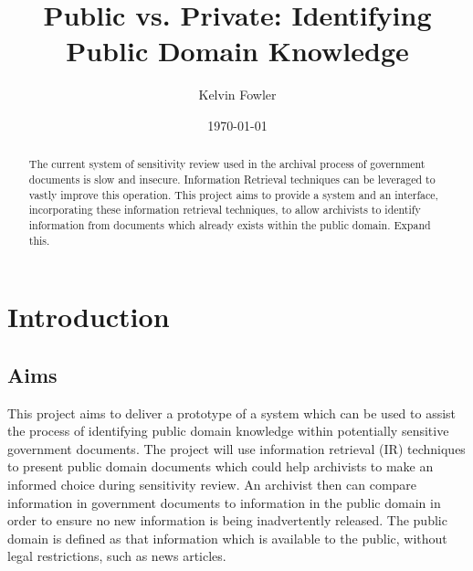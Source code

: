 \documentclass{l4proj}
\title{Public vs. Private: \newline Identifying Public Domain Knowledge}
\author{Kelvin Fowler}
\date{\today}
\begin{document}
\maketitle

\begin{abstract}
The current system of sensitivity review used in the archival process of government documents is slow and insecure. Information Retrieval techniques can be leveraged to vastly improve this operation. This project aims to provide a system and an interface, incorporating these information retrieval techniques, to allow archivists to identify information from documents which already exists within the public domain.
Expand this.
\end{abstract}


\educationalconsent
\tableofcontents
\listoftodos

\chapter{Introduction}

\section{Aims}
This project aims to deliver a prototype of a system which can be used to assist the process of identifying public domain knowledge within potentially sensitive government documents. The project will use information retrieval (IR) techniques to present public domain documents which could help archivists to make an informed choice during sensitivity review. An archivist then can compare information in government documents to information in the public domain in order to ensure no new information is being inadvertently released.
The public domain is defined as that information which is available to the public, without legal restrictions, such as news articles.
\end{document}
